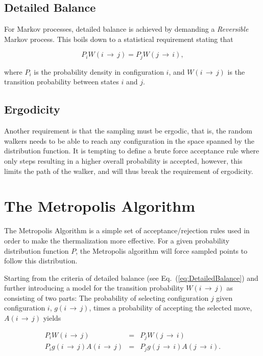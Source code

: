 \subsection{Detailed Balance} 

For Markov processes, detailed balance is achieved by demanding a \textit{Reversible} Markov process. This boils down to a statistical requirement stating that 

\begin{equation}
 \label{eq:DetailedBalance}
 P_iW(i\,\rightarrow\,j) = P_jW(j\,\rightarrow\,i),
\end{equation}

where $P_i$ is the probability density in configuration $i$, and $W(i\,\rightarrow\,j)$ is the transition probability between states $i$ and $j$. 

\subsection{Ergodicity}

Another requirement is that the sampling must be ergodic, that is, the random walkers needs to be able to reach any configuration in the space spanned by the distribution function. It is tempting to define a brute force acceptance rule where only steps resulting in a higher overall probability is accepted, however, this limits the path of the walker, and will thus break the requirement of ergodicity.

\section{The Metropolis Algorithm}
\label{sec:MetroMain}

The Metropolis Algorithm is a simple set of acceptance/rejection rules used in order to make the thermalization more effective. For a given probability distribution function $P$, the Metropolis algorithm will force sampled points to follow this distribution. 

Starting from the criteria of detailed balance (see Eq.~(\ref{eq:DetailedBalance}) and further introducing a model for the transition probability $W(i\,\rightarrow\,j)$ as consisting of two parts: The probability of selecting configuration $j$ given configuration $i$, $g(i\,\rightarrow\,j)$, times a probability of accepting the selected move, $A(i\,\rightarrow\,j)$ yields

\begin{eqnarray}
 \label{eq:metro1}
 P_iW(i\,\rightarrow\,j) &=& P_jW(j\,\rightarrow\,i) \nonumber \\
 P_ig(i\,\rightarrow\,j)A(i\,\rightarrow\,j) &=& P_jg(j\,\rightarrow\,i)A(j\,\rightarrow\,i).
\end{eqnarray}

